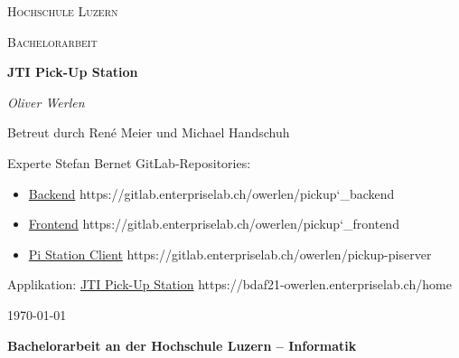 
		{\scshape\LARGE Hochschule Luzern\par}
		\vspace{1cm}
		{\scshape\Large Bachelorarbeit\par}
		\vspace{1.5cm}
		{\huge\bfseries JTI Pick-Up Station\par}
		\vspace{1.5cm}
		{\Large\itshape Oliver Werlen\par}
		\vfill
		Betreut durch René Meier und Michael Handschuh\par
		Experte Stefan Bernet
		\vfill
		GitLab-Repositories: \par
		\begin{itemize}
			\item \href{https://gitlab.enterpriselab.ch/owerlen/pickup_backend}{Backend} https://gitlab.enterpriselab.ch/owerlen/pickup\char`_backend \par
			\item \href{https://gitlab.enterpriselab.ch/owerlen/pickup_frontend}{Frontend} https://gitlab.enterpriselab.ch/owerlen/pickup\char`_frontend\par
			\item \href{https://gitlab.enterpriselab.ch/owerlen/pickup-piserver}{Pi Station Client} https://gitlab.enterpriselab.ch/owerlen/pickup-piserver\par
		\end{itemize}
		\vfill
		Applikation: 
		\href{https://bdaf21-owerlen.enterpriselab.ch/home}{JTI Pick-Up Station} https://bdaf21-owerlen.enterpriselab.ch/home \par
		\vfill
		{\large \today\par}

	\newpage
	
	\noindent
	\fontsize{12}{14}
	\textbf{Bachelorarbeit an der Hochschule Luzern -- Informatik} \\ \vspace*{0.6cm}
	
